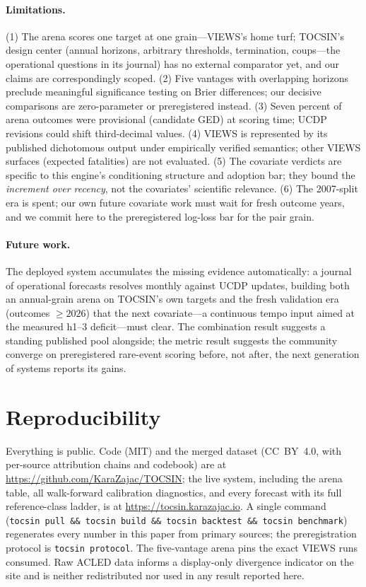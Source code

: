\documentclass[11pt]{article}
\begin{document}
\paragraph{Limitations.} (1) The arena scores one target at one
grain---VIEWS's home turf; TOCSIN's design center (annual horizons,
arbitrary thresholds, termination, coups---the operational questions in its
journal) has no external comparator yet, and our claims are correspondingly
scoped. (2) Five vantages with overlapping horizons preclude meaningful
significance testing on Brier differences; our decisive comparisons are
zero-parameter or preregistered instead. (3) Seven percent of arena outcomes
were provisional (candidate GED) at scoring time; UCDP revisions could shift
third-decimal values. (4) VIEWS is represented by its published dichotomous
output under empirically verified semantics; other VIEWS surfaces (expected
fatalities) are not evaluated. (5) The covariate verdicts are specific to
this engine's conditioning structure and adoption bar; they bound the
\emph{increment over recency}, not the covariates' scientific relevance.
(6) The 2007-split era is spent; our own future covariate work must wait for
fresh outcome years, and we commit here to the preregistered log-loss bar
for the pair grain.

\paragraph{Future work.} The deployed system accumulates the missing
evidence automatically: a journal of operational forecasts resolves monthly
against UCDP updates, building both an annual-grain arena on TOCSIN's own
targets and the fresh validation era (outcomes ${\geq}2026$) that the next
covariate---a continuous tempo input aimed at the measured h1--3
deficit---must clear. The combination result suggests a standing published
pool alongside; the metric result suggests the community converge on
preregistered rare-event scoring before, not after, the next generation of
systems reports its gains.

\section{Reproducibility}\label{sec:repro}

Everything is public. Code (MIT) and the merged dataset (CC~BY~4.0, with
per-source attribution chains and codebook) are at
\url{https://github.com/KaraZajac/TOCSIN}; the live system, including the
arena table, all walk-forward calibration diagnostics, and every forecast
with its full reference-class ladder, is at
\url{https://tocsin.karazajac.io}. A single command (\texttt{tocsin pull \&\&
tocsin build \&\& tocsin backtest \&\& tocsin benchmark}) regenerates every
number in this paper from primary sources; the preregistration protocol is
\texttt{tocsin protocol}. The five-vantage arena pins the exact VIEWS runs
consumed. Raw ACLED data informs a display-only divergence indicator on the
site and is neither redistributed nor used in any result reported here.
\end{document}
